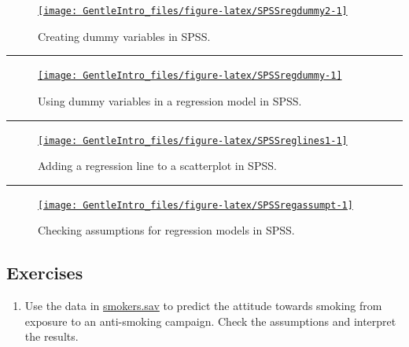 \documentclass[a4paper]{book}
\providecommand{\tightlist}{%
  \setlength{\itemsep}{0pt}\setlength{\parskip}{0pt}}
\theoremstyle{definition}
\theoremstyle{definition}
\theoremstyle{definition}
\theoremstyle{remark}
\begin{document}
\begin{figure}[H]
\href{https://www.youtube.com/embed/0y0q-lKiPYk}{\texttt{[image: GentleIntro\_files/figure-latex/SPSSregdummy2-1]} }\caption{Creating dummy variables in SPSS.}\label{fig:SPSSregdummy2}
\end{figure}

\begin{center}\rule{0.5\linewidth}{\linethickness}\end{center}

\begin{figure}[H]
\href{https://www.youtube.com/embed/AJ88dheUieY}{\texttt{[image: GentleIntro\_files/figure-latex/SPSSregdummy-1]} }\caption{Using dummy variables in a regression model in SPSS.}\label{fig:SPSSregdummy}
\end{figure}

\begin{center}\rule{0.5\linewidth}{\linethickness}\end{center}

\begin{figure}[H]
\href{https://www.youtube.com/embed/OQEylRkeVzI}{\texttt{[image: GentleIntro\_files/figure-latex/SPSSreglines1-1]} }\caption{Adding a regression line to a scatterplot in SPSS.}\label{fig:SPSSreglines1}
\end{figure}

\begin{center}\rule{0.5\linewidth}{\linethickness}\end{center}

\begin{figure}[H]
\href{https://www.youtube.com/embed/AtzXHORzxlA}{\texttt{[image: GentleIntro\_files/figure-latex/SPSSregassumpt-1]} }\caption{Checking assumptions for regression models in SPSS.}\label{fig:SPSSregassumpt}
\end{figure}

\subsection{Exercises}\label{exercises-7}

\begin{enumerate}
\def\labelenumi{\arabic{enumi}.}
\tightlist
\item
  Use the data in
  \href{http://82.196.4.233:3838/data/smokers.sav}{smokers.sav} to
  predict the attitude towards smoking from exposure to an anti-smoking
  campaign. Check the assumptions and interpret the results.
\end{enumerate}
\end{document}

